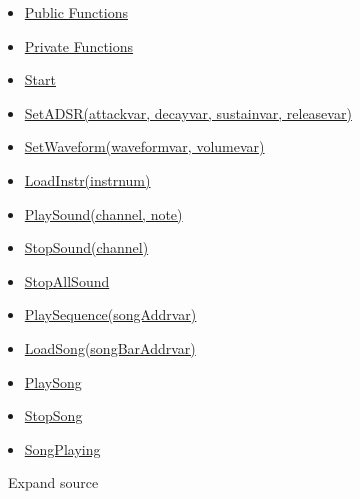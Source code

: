 \begin{itemize}
\itemsep1pt\parskip0pt
\item
  \hyperref[LameAudio.spin-PublicFunctions]{Public Functions}
\item
  \hyperref[LameAudio.spin-PrivateFunctions]{Private Functions}
\end{itemize}


\begin{itemize}
\itemsep1pt\parskip0pt
\item
  \hyperref[LameAudio.spin-Start]{Start}
\item
  \hyperref[LameAudio.spin-SetADSR(attackvar,decayvar,sustainvar,releasevar)]{SetADSR(attackvar,
  decayvar, sustainvar, releasevar)}
\item
  \hyperref[LameAudio.spin-SetWaveform(waveformvar,volumevar)]{SetWaveform(waveformvar,
  volumevar)}
\item
  \hyperref[LameAudio.spin-LoadInstr(instrnum)]{LoadInstr(instrnum)}
\item
  \hyperref[LameAudio.spin-PlaySound(channel,note)]{PlaySound(channel,
  note)}
\item
  \hyperref[LameAudio.spin-StopSound(channel)]{StopSound(channel)}
\item
  \hyperref[LameAudio.spin-StopAllSound]{StopAllSound}
\item
  \hyperref[LameAudio.spin-PlaySequence(songAddrvar)]{PlaySequence(songAddrvar)}
\item
  \hyperref[LameAudio.spin-LoadSong(songBarAddrvar)]{LoadSong(songBarAddrvar)}
\item
  \hyperref[LameAudio.spin-PlaySong]{PlaySong}
\item
  \hyperref[LameAudio.spin-StopSong]{StopSong}
\item
  \hyperref[LameAudio.spin-SongPlaying]{SongPlaying}
\end{itemize}


\textbf{} ~Expand source

